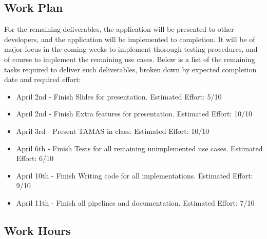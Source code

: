 \documentclass[12pt]{article}
\begin{document}
\subsection{Work Plan}
For the remaining deliverables, the application will be presented to other developers, and the
application will be implemented to completion. It will be of major focus in the coming weeks to
implement thorough testing procedures, and of course to implement the remaining use cases. Below is
a list of the remaining tasks required to deliver such deliverables, broken down by expected
completion date and required effort:

\begin{itemize}
   \item April 2nd - Finish Slides for presentation. Estimated Effort: 5/10
   \item April 2nd - Finish Extra features for presentation. Estimated Effort: 10/10
   \item  April 3rd - Present TAMAS in class. Estimated Effort: 10/10 
   \item  April 6th - Finish Tests for all remaining unimplemented use cases. Estimated Effort: 6/10
   \item  April 10th - Finish Writing code for all implementations. Estimated Effort: 9/10
   \item April 11th - Finish all pipelines and documentation. Estimated Effort: 7/10
\end{itemize}

 \subsection{Work Hours}
\end{document}
